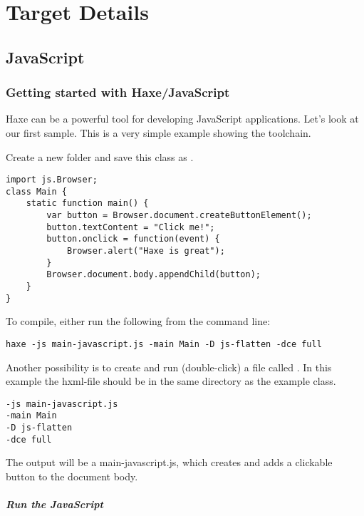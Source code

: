 \chapter{Target Details}
\label{target-details}

\section{JavaScript}
\label{target-javascript}

\subsection{Getting started with Haxe/JavaScript}
\label{target-javascript-getting-started}

Haxe can be a powerful tool for developing JavaScript applications. Let's look at our first sample.
This is a very simple example showing the toolchain. 

Create a new folder and save this class as .

\begin{lstlisting}
import js.Browser;
class Main {
    static function main() {
        var button = Browser.document.createButtonElement();
        button.textContent = "Click me!";
        button.onclick = function(event) {
            Browser.alert("Haxe is great");
        }
        Browser.document.body.appendChild(button);
    }
}
\end{lstlisting}

To compile, either run the following from the command line:

\begin{lstlisting}
haxe -js main-javascript.js -main Main -D js-flatten -dce full
\end{lstlisting}

Another possibility is to create and run (double-click) a file called . In this example the hxml-file should be in the same directory as the example class.

\begin{lstlisting}
-js main-javascript.js
-main Main
-D js-flatten
-dce full
\end{lstlisting}

The output will be a main-javascript.js, which creates and adds a clickable button to the document body.

\paragraph{Run the JavaScript}

